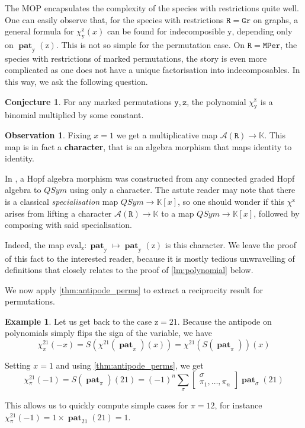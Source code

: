 \documentclass[12pt, reqno]{amsart}
\theoremstyle{definition}
\newtheorem{obs}[thm]{Observation}
\newtheorem{smpl}[thm]{Example}
\newtheorem{conj}[thm]{Conjecture}
\DeclareMathOperator{\pat}{\mathbf{pat}}
\begin{document}
The MOP encapsulates the complexity of the species with restrictions quite well.
One can easily observe that, for the species with restrictions $\mathtt{R} = \mathtt{Gr}$ on graphs, a general formula for $\chi^{\mathrm{z}}_{\mathrm{y}}(x)$ can be found for indecomposible $\mathrm{y}$, depending only on $\pat_{\mathrm{y}}(\mathrm{z})$.
This is not so simple for the permutation case.
On $\mathtt{R} = \mathtt{MPer}$, the species with restrictions of marked permutations, the story is even more complicated as one does not have a unique factorisation into indecomposables.
In this way, we ask the following question.

\begin{conj}
    For any marked permutations $\mathtt{y}, \mathtt{z}$, the polynomial $\chi^{\mathrm{z}}_{\mathrm{y}}$ is a binomial multiplied by some constant.
\end{conj}

\begin{obs}
    Fixing $x = 1$ we get a multiplicative map $\mathcal{A}(\mathtt{R}) \to \mathbb{K}$.
    This map is in fact a \textbf{character}, that is an algebra morphism that maps identity to identity.
    
    In \cite{aguiar2006combinatorial}, a Hopf algebra morphism was constructed from any connected graded Hopf algebra to $QSym$ using only a character.
    The astute reader may note that there is a classical \textit{specialisation} map $QSym \to \mathbb{K}[x]$, so one should wonder if this $\chi^{\mathrm{z}}$ arises from lifting a character $\mathcal{A}(\mathtt{R}) \to \mathbb{K}$ to a map $QSym \to \mathbb{K}[x]$, followed by composing with said specialisation.
    
    Indeed, the map $\mathrm{eval}_{\mathrm{z}} : \pat_{\mathrm{y}} \mapsto \pat_{\mathrm{y}}(\mathrm{z}) $ is this character.
    We leave the proof of this fact to the interested reader, because it is mostly tedious unwravelling of definitions that closely relates to the proof of \cref{lm:polynomial} below.
\end{obs}

We now apply \cref{thm:antipode_perms} to extract a reciprocity result for permutations.

\begin{smpl}
    Let us get back to the case $\mathrm{z} = 21$.
    Because the antipode on polynomials simply flips the sign of the variable, we have
$$\chi^{21}_{\pi}(-x) = S(\chi^{21}(\pat_{\pi})(x)) =\chi^{21}(S(\pat_{\pi}))(x) $$

Setting $x = 1$ and using \cref{thm:antipode_perms}, we get
$$\chi^{21}_{\pi}(-1) = S(\pat_{\pi})(21) = (-1)^n \sum_{\sigma} 
    \begin{bmatrix}
    \sigma \\ \pi_1, \dots, \pi_n
    \end{bmatrix}\pat_{\sigma}(21) $$

    This allows us to quickly compute simple cases for $\pi = 12$, for instance $\chi^{21}_{\pi}(-1) = 1 \times \pat_{21}(21) = 1$.
\end{smpl}
\end{document}
